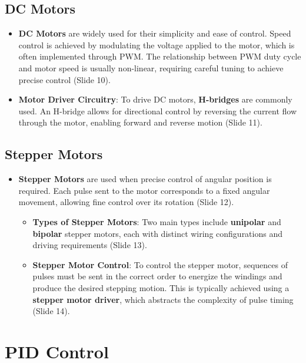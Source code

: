 \documentclass[
  14pt,
  a4paper,
  numbers=noendperiod,
  headinclude=true,
  footinclude=true,
  DIV=calc]{scrreprt}
\begin{document}
\subsection{DC Motors}\label{dc-motors}

\begin{itemize}
\item
  \textbf{DC Motors} are widely used for their simplicity and ease of
  control. Speed control is achieved by modulating the voltage applied
  to the motor, which is often implemented through PWM. The relationship
  between PWM duty cycle and motor speed is usually non-linear,
  requiring careful tuning to achieve precise control (Slide 10).
\item
  \textbf{Motor Driver Circuitry}: To drive DC motors,
  \textbf{H-bridges} are commonly used. An H-bridge allows for
  directional control by reversing the current flow through the motor,
  enabling forward and reverse motion (Slide 11).
\end{itemize}

\subsection{Stepper Motors}\label{stepper-motors}

\begin{itemize}
\item
  \textbf{Stepper Motors} are used when precise control of angular
  position is required. Each pulse sent to the motor corresponds to a
  fixed angular movement, allowing fine control over its rotation (Slide
  12).

  \begin{itemize}
  \item
    \textbf{Types of Stepper Motors}: Two main types include
    \textbf{unipolar} and \textbf{bipolar} stepper motors, each with
    distinct wiring configurations and driving requirements (Slide 13).
  \item
    \textbf{Stepper Motor Control}: To control the stepper motor,
    sequences of pulses must be sent in the correct order to energize
    the windings and produce the desired stepping motion. This is
    typically achieved using a \textbf{stepper motor driver}, which
    abstracts the complexity of pulse timing (Slide 14).
  \end{itemize}
\end{itemize}

\section{PID Control}\label{pid-control}
\end{document}
